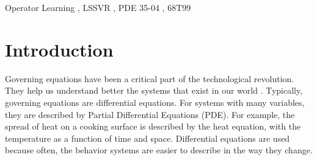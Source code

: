 \documentclass[preprint,12pt,times,authoryear]{elsarticle}
\begin{document}
\begin{frontmatter}
  \title{\judul}
  \author[upi]{Ahmad Izzuddin}
  \author[upi]{Lala Septem Riza}
  \author[upi]{Muhammad Nursalman}

  \begin{abstract}
    Numerical models of systems are a crucial part of science and engineering. The use of machine learning in this space for operator learning provides an alternative as data-driven surrogates. The Fourier Transform provides a key component for learning the relationship between a function and its derivatives. Building on Spectral Neural Operators (SNO), we propose a Support Vector Machine (SVM) based framework to learn the underlying governing equations of a system based on data. We study the viability and interpretability of the proposed framework on the derivative equation and the Burgers' equation. The model is able to learn from mathematically correct random data and is able to partially generalize to an exact solution of the Burgers' equation. The learned model is interpreted and verified to have learned the correct contributions of the input function coefficients to the output function coefficients.
  \end{abstract}
  \begin{keyword}
    Operator Learning \sep{} LSSVR \sep{} PDE
    \MSC{} 35{-}04 \sep{} 68T99
  \end{keyword}

\end{frontmatter}
\section{Introduction}
Governing equations have been a critical part of the technological revolution. They help us understand better the systems that exist in our world \citep{braunDifferentialEquationsTheir1993}. Typically, governing equations are differential equations. For systems with many variables, they are described by Partial Differential Equations (PDE). For example, the spread of heat on a cooking surface is described by the heat equation, with the temperature as a function of time and space. Differential equations are used because often, the behavior systems are easier to describe in the way they change.
\end{document}
